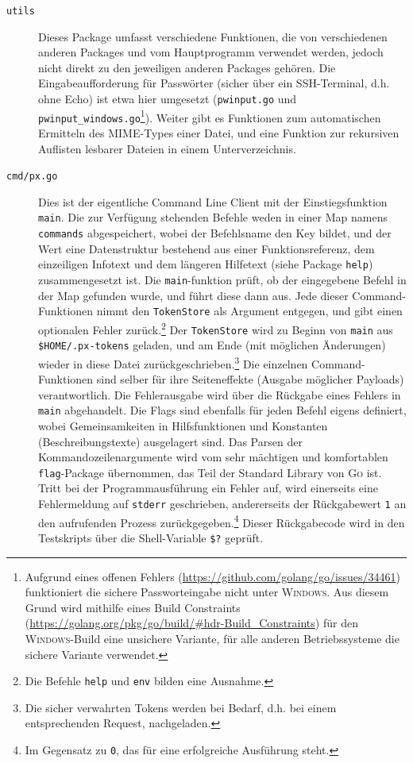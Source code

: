 \begin{description}
    \item[\texttt{utils}] Dieses Package umfasst verschiedene Funktionen, die von verschiedenen anderen Packages und vom Hauptprogramm verwendet werden, jedoch nicht direkt zu den jeweiligen anderen Packages gehören. Die Eingabeaufforderung für Passwörter (sicher über ein SSH-Terminal, d.h. ohne Echo) ist etwa hier umgesetzt (\texttt{pwinput.go} und \texttt{pwinput\_windows.go}\footnote{Aufgrund eines offenen Fehlers (\url{https://github.com/golang/go/issues/34461}) funktioniert die sichere Passworteingabe nicht unter \textsc{Windows}. Aus diesem Grund wird mithilfe eines Build Constraints (\url{https://golang.org/pkg/go/build/\#hdr-Build\_Constraints}) für den \textsc{Windows}-Build eine unsichere Variante, für alle anderen Betriebssysteme die sichere Variante verwendet.}). Weiter gibt es Funktionen zum automatischen Ermitteln des MIME-Types einer Datei, und eine Funktion zur rekursiven Auflisten lesbarer Dateien in einem Unterverzeichnis.
    \item[\texttt{cmd/px.go}] Dies ist der eigentliche Command Line Client mit der Einstiegsfunktion \texttt{main}. Die zur Verfügung stehenden Befehle weden in einer Map namens \texttt{commands} abgespeichert, wobei der Befehlsname den Key bildet, und der Wert eine Datenstruktur bestehend aus einer Funktionsreferenz, dem einzeiligen Infotext und dem längeren Hilfetext (siehe Package \texttt{help}) zusammengesetzt ist. Die \texttt{main}-funktion prüft, ob der eingegebene Befehl in der Map gefunden wurde, und führt diese dann aus. Jede dieser Command-Funktionen nimmt den \texttt{TokenStore} als Argument entgegen, und gibt einen optionalen Fehler zurück.\footnote{Die Befehle \texttt{help} und \texttt{env} bilden eine Ausnahme.} Der \texttt{TokenStore} wird zu Beginn von \texttt{main} aus \texttt{\$HOME/.px-tokens} geladen, und am Ende (mit möglichen Änderungen) wieder in diese Datei zurückgeschrieben.\footnote{Die sicher verwahrten Tokens werden bei Bedarf, d.h. bei einem entsprechenden Request, nachgeladen.} Die einzelnen Command-Funktionen sind selber für ihre Seiteneffekte (Ausgabe möglicher Payloads) verantwortlich. Die Fehlerausgabe wird über die Rückgabe eines Fehlers in \texttt{main} abgehandelt. Die Flags sind ebenfalls für jeden Befehl eigens definiert, wobei Gemeinsamkeiten in Hilfsfunktionen und Konstanten (Beschreibungstexte) ausgelagert sind. Das Parsen der Kommandozeilenargumente wird vom sehr mächtigen und komfortablen \texttt{flag}-Package übernommen, das Teil der Standard Library von \textsc{Go} ist. Tritt bei der Programmausführung ein Fehler auf, wird einerseits eine Fehlermeldung auf \texttt{stderr} geschrieben, andererseits der Rückgabewert \texttt{1} an den aufrufenden Prozess zurückgegeben.\footnote{Im Gegensatz zu \texttt{0}, das für eine erfolgreiche Ausführung steht.} Dieser Rückgabecode wird in den Testskripts über die Shell-Variable \texttt{\$?} geprüft.
\end{description}

